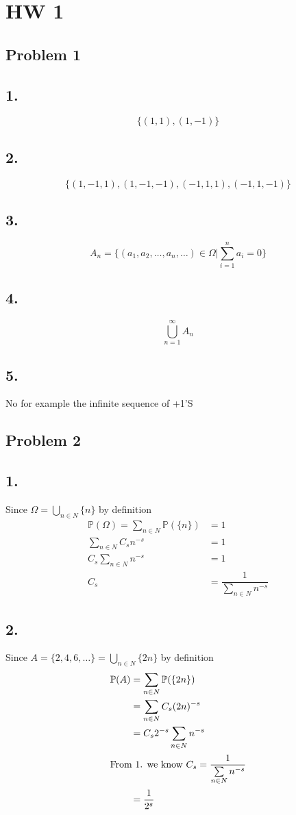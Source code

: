 \documentclass[12pt, letterpaper]{article}
\theoremstyle{definition}
\renewcommand{\P}{\mathbb{P}}
\begin{document}
\pagestyle{fancy}
\fancyhf{}
\fancyhead[ROE]{\thepage}

\section*{HW 1}
\subsection*{Problem 1}
\subsection*{1.}
\[\{(1,1),(1,-1)\}\]
\subsection*{2.}
\[\{(1,-1,1),(1,-1,-1),
   (-1,1,1),(-1,1,-1)
\}\]
\subsection*{3.}
\[A_n=\{(a_1,a_2,\dots,a_n,\dots) \in \Omega | \sum\limits_{i=1}^na_i=0\}\]
\subsection*{4.}
\[\bigcup\limits_{n=1}^\infty A_n\]
\subsection*{5.}
No for example the infinite sequence of +1'S

\newpage
\subsection*{Problem 2}
\subsection*{1.}
Since $\Omega=\bigcup\limits_{n \in N}\{n\}$ by definition 
\begin{align*}
    \P(\Omega)=
    \sum\limits_{n \in N}\P(\{n\})&=1\\
    \sum\limits_{n \in N}C_sn^{-s}&=1\\
    C_s\sum\limits_{n \in N}n^{-s}&=1\\
    C_s&=\dfrac{1}{\sum\limits_{n \in N}n^{-s}}
\end{align*}
\subsection*{2.}
Since  $A=\{2,4,6,\dots\}=\bigcup\limits_{n \in N}\{2n\}$ by definition 
\begin{align*}
    \P(A)
    &=\sum\limits_{n \in N}\P(\{2n\})\\
    &=\sum\limits_{n \in N}C_s(2n)^{-s}\\
    &=C_s2^{-s}\sum\limits_{n \in N}n^{-s}\\ \intertext{From 1. we know $C_s=\dfrac{1}{\sum\limits_{n \in N}n^{-s}}$} 
    &=\dfrac{1}{2^{s}}
\end{align*}
\end{document}

